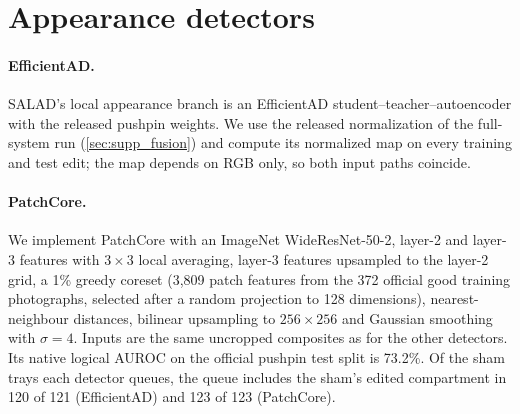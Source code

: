 \section{Appearance detectors}
\label{sec:supp_appearance}
\begin{table}[t]
\centering
\caption{Matched pushpin trays with the 1.6k-step continuations and the appearance detectors (re-segmented path, 138 photographs). Alarms out of 138; spread in \%; $C$ is untouched compartments queued per fault and $R$ target recall (\%) at the training-fixed threshold or list; pooled $C$ mixes relocations and vacancies; region area (\%) with faulty-tray negatives only or with source and sham compartments added. The rule needs task knowledge.}
\label{tab:matched_v2}
\small\setlength{\tabcolsep}{4.2pt}

\end{table}
\paragraph{EfficientAD.} SALAD's local appearance branch is an EfficientAD student--teacher--autoencoder \cite{batzner2024} with the released pushpin weights. We use the released normalization of the full-system run (\cref{sec:supp_fusion}) and compute its normalized map on every training and test edit; the map depends on RGB only, so both input paths coincide.
\paragraph{PatchCore.} We implement PatchCore \cite{roth2022} with an ImageNet WideResNet-50-2, layer-2 and layer-3 features with $3{\times}3$ local averaging, layer-3 features upsampled to the layer-2 grid, a 1\% greedy coreset (3{,}809 patch features from the 372 official good training photographs, selected after a random projection to 128 dimensions), nearest-neighbour distances, bilinear upsampling to $256{\times}256$ and Gaussian smoothing with $\sigma=4$. Inputs are the same uncropped composites as for the other detectors. Its native logical AUROC on the official pushpin test split is 73.2\%. Of the sham trays each detector queues, the queue includes the sham's edited compartment in 120 of 121 (EfficientAD) and 123 of 123 (PatchCore).

